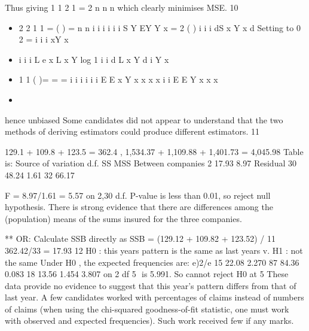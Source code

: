 \documentclass[a4paper,12pt]{article}
\begin{document}

Thus giving 1
1 2
1
=
2
n
n n
%
which clearly minimises MSE.
10 
\begin{itemize}
\item 2 2
1 1
= ( ) =
n n
i i i i
i i
S Y EY Y x
= 2 ( ) i i i
dS
x Y x
d
 Setting to 0  2 = i i
i
xY
x
\item %
i i i L e x L x Y %
log 1
i i
d L
x Y
d
i
Y
x%
\item %
1 1
( )= = = i i i i
i i
E E x Y x x
x x
i i
E E Y x
x x
    \item 
\end{itemize}
hence unbiased
Some candidates did not appear to understand that the two methods of deriving
estimators could produce different estimators.
11 

129.1 + 109.8 + 123.5 = 362.4 , 1,534.37 + 1,109.88 + 1,401.73 = 4,045.98
Table is:
Source of variation d.f. SS MSS
Between companies 2 17.93 8.97
Residual 30 48.24 1.61
32 66.17


F = 8.97/1.61 = 5.57 on 2,30 d.f.
P-value is less than 0.01, so reject null hypothesis.
There is strong evidence that there are differences among the (population)
means of the sums insured for the three companies.

** OR: Calculate SSB directly as
SSB = (129.12 + 109.82 + 123.52) / 11  362.42/33 = 17.93
12 H0 : this years pattern is the same as last years v. H1 : not the same
Under H0 , the expected frequencies are:
e)2/e
15 22.08 2.270
87 84.36 0.083
18 13.56 1.454
3.807 on 2 df
5%
 is 5.991. So cannot reject H0 at 5%
These data provide no evidence to suggest that this year’s pattern differs from
that of last year.
A few candidates worked with percentages of claims instead of numbers of claims
(when using the chi-squared goodness-of-fit statistic, one must work with observed
and expected frequencies). Such work received few if any marks.
\end{document}

